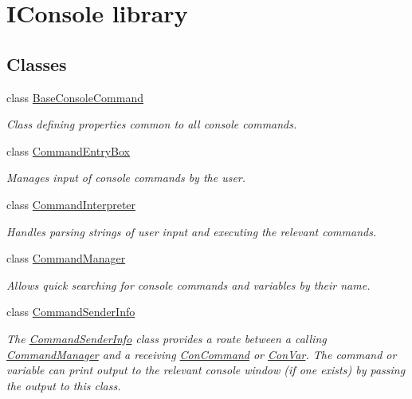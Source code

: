 \hypertarget{group___i_console}{\section{I\-Console library}
\label{group___i_console}
}
\subsection*{Classes}
\begin{DoxyCompactItemize}
\item 
class \hyperlink{class_base_console_command}{Base\-Console\-Command}
\begin{DoxyCompactList}\small\item\em Class defining properties common to all console commands. \end{DoxyCompactList}\item 
class \hyperlink{class_command_entry_box}{Command\-Entry\-Box}
\begin{DoxyCompactList}\small\item\em Manages input of console commands by the user. \end{DoxyCompactList}\item 
class \hyperlink{class_command_interpreter}{Command\-Interpreter}
\begin{DoxyCompactList}\small\item\em Handles parsing strings of user input and executing the relevant commands. \end{DoxyCompactList}\item 
class \hyperlink{class_command_manager}{Command\-Manager}
\begin{DoxyCompactList}\small\item\em Allows quick searching for console commands and variables by their name. \end{DoxyCompactList}\item 
class \hyperlink{class_command_sender_info}{Command\-Sender\-Info}
\begin{DoxyCompactList}\small\item\em The \hyperlink{class_command_sender_info}{Command\-Sender\-Info} class provides a route between a calling \hyperlink{class_command_manager}{Command\-Manager} and a receiving \hyperlink{class_con_command}{Con\-Command} or \hyperlink{class_con_var}{Con\-Var}. The command or variable can print output to the relevant console window (if one exists) by passing the output to this class. \end{DoxyCompactList}\item 

\end{DoxyCompactItemize}
